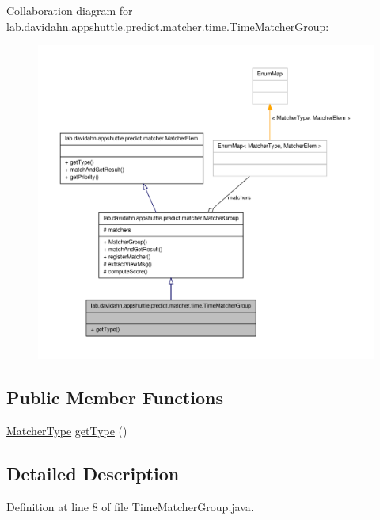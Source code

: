 \-Collaboration diagram for lab.\-davidahn.\-appshuttle.\-predict.\-matcher.\-time.\-Time\-Matcher\-Group\-:
\nopagebreak
\begin{figure}[H]
\begin{center}
\leavevmode
\includegraphics[width=350pt]{classlab_1_1davidahn_1_1appshuttle_1_1predict_1_1matcher_1_1time_1_1_time_matcher_group__coll__graph}
\end{center}
\end{figure}
\subsection*{\-Public \-Member \-Functions}
\begin{DoxyCompactItemize}
\item 
\hyperlink{enumlab_1_1davidahn_1_1appshuttle_1_1predict_1_1matcher_1_1_matcher_type}{\-Matcher\-Type} \hyperlink{classlab_1_1davidahn_1_1appshuttle_1_1predict_1_1matcher_1_1time_1_1_time_matcher_group_ae008444f6e42c8469e999c98febaf87b}{get\-Type} ()
\end{DoxyCompactItemize}


\subsection{\-Detailed \-Description}


\-Definition at line 8 of file \-Time\-Matcher\-Group.\-java.



